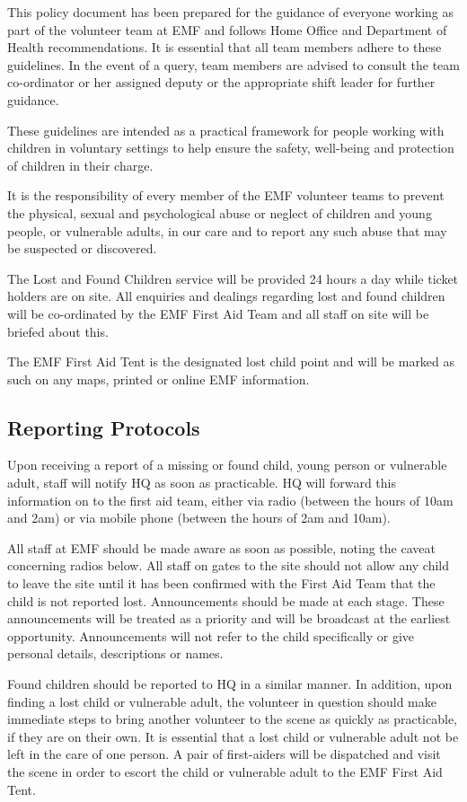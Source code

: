 This policy document has been prepared for the guidance of everyone working as
part of the volunteer team at EMF and follows Home Office and Department of
Health recommendations. It is essential that all team members adhere to these
guidelines. In the event of a query, team members are advised to consult the
team co-ordinator or her assigned deputy or the appropriate shift leader for
further guidance.

These guidelines are intended as a practical framework for people working with
children in voluntary settings to help ensure the safety, well-being and
protection of children in their charge.

It is the responsibility of every member of the EMF volunteer teams to prevent
the physical, sexual and psychological abuse or neglect of children and young
people, or vulnerable adults, in our care and to report any such abuse that may
be suspected or discovered.

The Lost and Found Children service will be provided 24 hours a day while
ticket holders are on site. All enquiries and dealings regarding lost and found
children will be co-ordinated by the EMF First Aid Team and all staff on site
will be briefed about this.

The EMF First Aid Tent is the designated lost child point and will be marked as
such on any maps, printed or online EMF information.

\subsection{Reporting Protocols}
Upon receiving a report of a missing or found child, young person or vulnerable
adult, staff will notify HQ as soon as practicable. HQ will forward this
information on to the first aid team, either via radio (between the hours of
10am and 2am) or via mobile phone (between the hours of 2am and 10am).

All staff at EMF should be made aware as soon as possible, noting the
caveat concerning radios below. All staff on gates to the site should not allow
any child to leave the site until it has been confirmed with the First Aid Team
that the child is not reported lost. Announcements should be made at each
stage. These announcements will be treated as a priority and will be broadcast
at the earliest opportunity. Announcements will not refer to the child
specifically or give personal details, descriptions or names.

Found children should be reported to HQ in a similar manner. In addition, upon
finding a lost child or vulnerable adult, the volunteer in question should make
immediate steps to bring another volunteer to the scene as quickly as
practicable, if they are on their own. It is essential that a lost child or
vulnerable adult not be left in the care of one person. A pair of first-aiders
will be dispatched and visit the scene in order to escort the child or
vulnerable adult to the EMF First Aid Tent.

